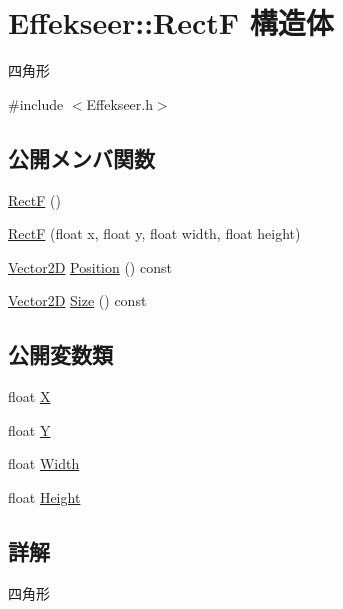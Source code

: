 \hypertarget{struct_effekseer_1_1_rect_f}{}\section{Effekseer\+:\+:RectF 構造体}
\label{struct_effekseer_1_1_rect_f}


四角形  




{\ttfamily \#include $<$Effekseer.\+h$>$}

\subsection*{公開メンバ関数}
\begin{DoxyCompactItemize}
\item 
\mbox{\hyperlink{struct_effekseer_1_1_rect_f_a938978f15a9b5236289b20224713fcc2}{RectF}} ()
\item 
\mbox{\hyperlink{struct_effekseer_1_1_rect_f_a72f2fdfae676fc5b0bd9925d323c7ac9}{RectF}} (float x, float y, float width, float height)
\item 
\mbox{\hyperlink{struct_effekseer_1_1_vector2_d}{Vector2D}} \mbox{\hyperlink{struct_effekseer_1_1_rect_f_a92a8bc17bbb603b380be735070373eea}{Position}} () const
\item 
\mbox{\hyperlink{struct_effekseer_1_1_vector2_d}{Vector2D}} \mbox{\hyperlink{struct_effekseer_1_1_rect_f_a39dafae1e2537ce75d55473e8ea8aa13}{Size}} () const
\end{DoxyCompactItemize}
\subsection*{公開変数類}
\begin{DoxyCompactItemize}
\item 
float \mbox{\hyperlink{struct_effekseer_1_1_rect_f_ae059c8a9c7b7df7675aa77add61de01f}{X}}
\item 
float \mbox{\hyperlink{struct_effekseer_1_1_rect_f_ac019b5783fec33a61954817f04ead8f0}{Y}}
\item 
float \mbox{\hyperlink{struct_effekseer_1_1_rect_f_a52f9173e47c5677a549b69f1659476b1}{Width}}
\item 
float \mbox{\hyperlink{struct_effekseer_1_1_rect_f_a3ac44a8eb7b5ac78db5b5d98d5d1d745}{Height}}
\end{DoxyCompactItemize}


\subsection{詳解}
四角形 

